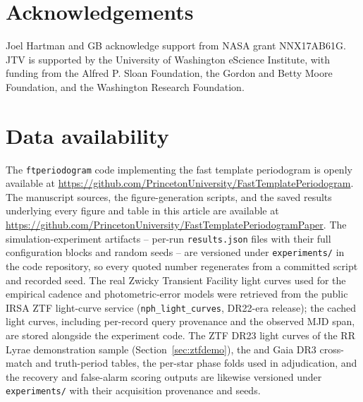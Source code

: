 \documentclass[apj]{emulateapj}
\begin{document}




\section*{Acknowledgements}
\begin{acknowledgements}
    Joel Hartman and GB acknowledge support from NASA grant NNX17AB61G. JTV is supported by the University of Washington eScience Institute, with funding from the Alfred P. Sloan Foundation, the Gordon and Betty Moore Foundation, and the Washington Research Foundation.
\end{acknowledgements}

\section*{Data availability}
The \texttt{ftperiodogram} code implementing the fast template
periodogram is openly available at
\url{https://github.com/PrincetonUniversity/FastTemplatePeriodogram}.
The manuscript sources, the figure-generation scripts, and the saved
results underlying every figure and table in this article are
available at
\url{https://github.com/PrincetonUniversity/FastTemplatePeriodogramPaper}.
The simulation-experiment artifacts -- per-run \texttt{results.json}
files with their full configuration blocks and random seeds -- are
versioned under \texttt{experiments/} in the code repository, so every
quoted number regenerates from a committed script and recorded seed.
The real Zwicky Transient Facility light curves used for the empirical
cadence and photometric-error models were retrieved from the public
IRSA ZTF light-curve service (\texttt{nph\_light\_curves}, DR22-era
release); the cached light curves, including per-record query
provenance and the observed MJD span, are stored alongside the
experiment code.  The ZTF DR23 light curves of the RR\,Lyrae
demonstration sample (Section~\ref{sec:ztfdemo}), the
\citet{Chen_etal_2020} and Gaia DR3 \citep{Clementini_etal_2023}
cross-match and truth-period tables, the per-star phase folds used in
adjudication, and the recovery and false-alarm scoring outputs are
likewise versioned under \texttt{experiments/} with their acquisition
provenance and seeds.
\end{document}
